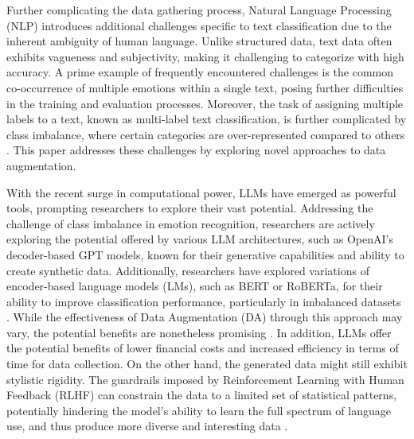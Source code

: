 \documentclass[manuscript]{clv3}
\begin{document}
Further complicating the data gathering process, Natural Language Processing (NLP) introduces additional challenges specific to text classification due to the inherent ambiguity of human language. Unlike structured data, text data often exhibits vagueness and subjectivity, making it challenging to categorize with high accuracy. A prime example of frequently encountered challenges is the common co-occurrence of multiple emotions within a single text, posing further difficulties in the training and evaluation processes. Moreover, the task of assigning multiple labels to a text, known as multi-label text classification, is further complicated by class imbalance, where certain categories are over-represented compared to others \cite{li-etal-2023-enhancing-extreme}. This paper addresses these challenges by exploring novel approaches to data augmentation. 

With the recent surge in computational power, LLMs have emerged as powerful tools, prompting researchers to explore their vast potential. Addressing the challenge of class imbalance in emotion recognition, researchers are actively exploring the potential offered by various LLM architectures, such as OpenAI's decoder-based GPT models, known for their generative capabilities and ability to create synthetic data. Additionally, researchers have explored variations of encoder-based language models (LMs), such as BERT or RoBERTa, for their ability to improve classification performance, particularly in imbalanced datasets \cite{DBLP:journals/corr/abs-2003-02245, 10.1145/3357384.3358040, 10.1145/3544548.3580688, yoo2021gpt3mix, van-nooten-daelemans-2023-improving, møller2023prompt, zhang2020data, li2023synthetic}. While the effectiveness of Data Augmentation (DA) through this approach may vary, the potential benefits are nonetheless promising \cite{10.1016/j.eswa.2022.118534}. In addition, LLMs offer the potential benefits of lower financial costs and increased efficiency in terms of time for data collection. On the other hand, the generated data might still exhibit stylistic rigidity. The guardrails imposed by Reinforcement Learning with Human Feedback (RLHF) can constrain the data to a limited set of statistical patterns, potentially hindering the model's ability to learn the full spectrum of language use, and thus produce more diverse and interesting data \cite{van-nooten-daelemans-2023-improving}.
\end{document}
